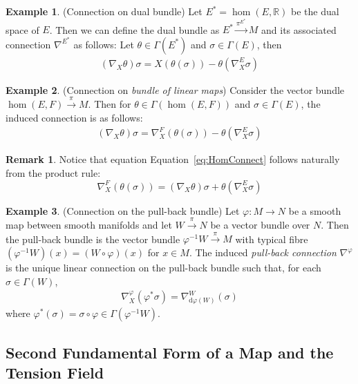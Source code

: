 \documentclass[12pt]{article}
\newcommand{\diff}{\text{d}}
\theoremstyle{definition}
\newtheorem{example}{Example}[subsection]
\newtheorem{remark}{Remark}[subsection]
\numberwithin{equation}{subsection}
\begin{document}
\begin{example}
(Connection on dual bundle) Let $E^*=\hom(E, \mathbb{R})$ be the dual space of $E$. Then we can define the dual bundle as $E^* \overset{\pi^{E^*}}{\longrightarrow} M$ and its associated connection $\nabla^{E^*}$ as follows: Let $\theta \in \Gamma(E^*)$ and $\sigma \in \Gamma(E)$, then
\begin{align}
    (\nabla_X \theta)\sigma = X(\theta(\sigma)) - \theta (\nabla _X^E \sigma)
\end{align}
\end{example}
\begin{example}
(Connection on \textit{bundle of linear maps}) Consider the vector bundle\\ ${\hom(E, F) \overset{\pi}{\longrightarrow} M}$. Then for $\theta \in \Gamma(\hom(E,F))$ and $\sigma \in \Gamma(E)$, the induced connection is as follows:
\begin{align}\label{eq:HomConnect}
    (\nabla_X \theta) \sigma = \nabla_X^F(\theta(\sigma)) - \theta(\nabla_X^E \sigma)
\end{align}
\begin{remark}
Notice that equation Equation~\ref{eq:HomConnect} follows naturally from the product rule:
$$
\nabla_X^F(\theta(\sigma)) = (\nabla_X\theta)\sigma + \theta(\nabla_X^E\sigma)
$$
\end{remark}
\end{example}
\begin{example}
(Connection on the pull-back bundle) Let $\varphi: M \rightarrow N$ be a smooth map between smooth manifolds and let $W \overset{\pi}{\longrightarrow} N$ be a vector bundle over $N$. Then the pull-back bundle is the vector bundle $\varphi^{-1}W \overset{\pi}{\longrightarrow} M$ with typical fibre $(\varphi^{-1}W)(x) = (W \circ \varphi)(x)$ for $x \in M$. The induced \textit{pull-back connection} $\nabla^\varphi$ is the unique linear connection on the pull-back bundle such that, for each $\sigma \in \Gamma(W)$,
\begin{align}
    \nabla_X^\varphi (\varphi^* \sigma) = \nabla^W_{\diff \varphi (W)}(\sigma)
\end{align}
where $\varphi^*(\sigma) = \sigma \circ \varphi \in \Gamma(\varphi^{-1}W)$.
\end{example}


\subsection{Second Fundamental Form of a Map and the Tension Field}\label{sec:2FFofPhi}
\end{document}
